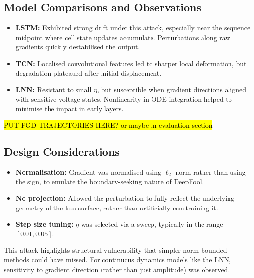 \subsection{Model Comparisons and Observations}
\begin{itemize}
    \item \textbf{LSTM:} Exhibited strong drift under this attack, especially near the sequence midpoint where cell state updates accumulate. Perturbations along raw gradients quickly destabilised the output.
    \item \textbf{TCN:} Localised convolutional features led to sharper local deformation, but degradation plateaued after initial displacement.
    \item \textbf{LNN:} Resistant to small $\eta$, but susceptible when gradient directions aligned with sensitive voltage states. Nonlinearity in ODE integration helped to minimise the impact in early layers.
\end{itemize}

\hl{PUT PGD TRAJECTORIES HERE? or maybe in evaluation section}


\subsection{Design Considerations}
\begin{itemize}
    \item \textbf{Normalisation:} Gradient was normalised using $\ell_2$ norm rather than using the sign, to emulate the boundary-seeking nature of DeepFool.
    \item \textbf{No projection:} Allowed the perturbation to fully reflect the underlying geometry of the loss surface, rather than artificially constraining it.
    \item \textbf{Step size tuning:} $\eta$ was selected via a sweep, typically in the range $[0.01, 0.05]$.
\end{itemize}

This attack highlights structural vulnerability that simpler norm-bounded methods could have missed. For continuous dynamics models like the LNN, sensitivity to gradient direction (rather than just amplitude) was observed.

